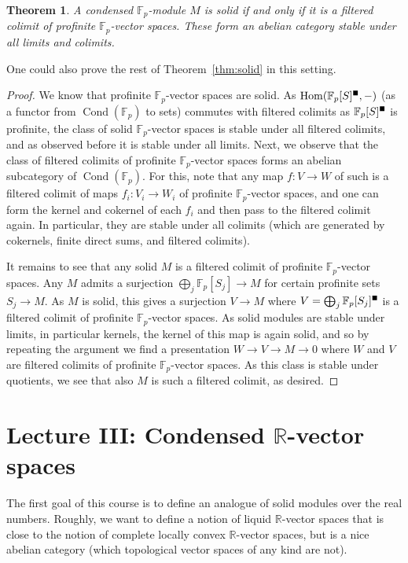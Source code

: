\documentclass[11pt]{amsbook}
\DeclareMathOperator{\Hom}{Hom}
\DeclareMathOperator{\Cond}{Cond}
\newcommand{\solid}{{\mathsmaller{\blacksquare}}}
\numberwithin{equation}{section}
\newtheorem{theorem}{Theorem}
\numberwithin{theorem}{section}
\theoremstyle{definition}
\begin{document}
\begin{theorem} A condensed $\mathbb F_p$-module $M$ is solid if and only if it is a filtered colimit of profinite $\mathbb F_p$-vector spaces. These form an abelian category stable under all limits and colimits.
\end{theorem}

One could also prove the rest of Theorem~\ref{thm:solid} in this setting.

\begin{proof} We know that profinite $\mathbb F_p$-vector spaces are solid. As $\Hom(\mathbb F_p[S]^\solid,-)$ (as a functor from $\Cond(\mathbb F_p)$ to sets) commutes with filtered colimits as $\mathbb F_p[S]^\solid$ is profinite, the class of solid $\mathbb F_p$-vector spaces is stable under all filtered colimits, and as observed before it is stable under all limits. Next, we observe that the class of filtered colimits of profinite $\mathbb F_p$-vector spaces forms an abelian subcategory of $\Cond(\mathbb F_p)$. For this, note that any map $f: V\to W$ of such is a filtered colimit of maps $f_i: V_i\to W_i$ of profinite $\mathbb F_p$-vector spaces, and one can form the kernel and cokernel of each $f_i$ and then pass to the filtered colimit again. In particular, they are stable under all colimits (which are generated by cokernels, finite direct sums, and filtered colimits).

It remains to see that any solid $M$ is a filtered colimit of profinite $\mathbb F_p$-vector spaces. Any $M$ admits a surjection $\bigoplus_j \mathbb F_p[S_j]\to M$ for certain profinite sets $S_j\to M$. As $M$ is solid, this gives a surjection $V\to M$ where $V=\bigoplus_j \mathbb F_p[S_j]^\solid$ is a filtered colimit of profinite $\mathbb F_p$-vector spaces. As solid modules are stable under limits, in particular kernels, the kernel of this map is again solid, and so by repeating the argument we find a presentation $W\to V\to M\to 0$ where $W$ and $V$ are filtered colimits of profinite $\mathbb F_p$-vector spaces. As this class is stable under quotients, we see that also $M$ is such a filtered colimit, as desired.
\end{proof}

\newpage

\section{Lecture III: Condensed $\mathbb R$-vector spaces}

The first goal of this course is to define an analogue of solid modules over the real numbers. Roughly, we want to define a notion of liquid $\mathbb R$-vector spaces that is close to the notion of complete locally convex $\mathbb R$-vector spaces, but is a nice abelian category (which topological vector spaces of any kind are not).
\end{document}
